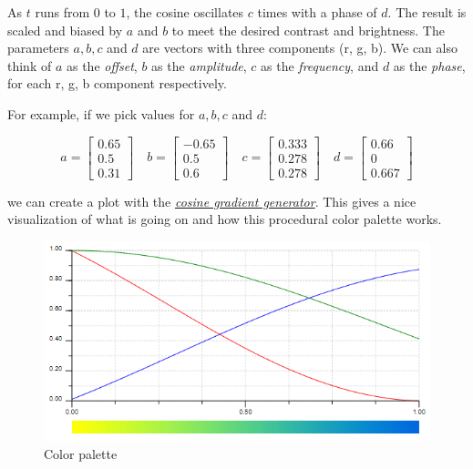 \documentclass[11pt]{article}
\makeatletter
\def\maxwidth{\ifdim\Gin@nat@width>\linewidth\linewidth
    \else\Gin@nat@width\fi}
\let\Oldincludegraphics\includegraphics
\renewcommand{\includegraphics}[1]{\Oldincludegraphics[width=.8\maxwidth]{#1}}
\makeatother
\begin{document}
    As \(t\) runs from \(0\) to \(1\), the cosine oscillates \(c\) times
with a phase of \(d\). The result is scaled and biased by \(a\) and
\(b\) to meet the desired contrast and brightness. The parameters
\(a, b, c\) and \(d\) are vectors with three components (r, g, b). We
can also think of \(a\) as the \emph{offset}, \(b\) as the
\emph{amplitude}, \(c\) as the \emph{frequency}, and \(d\) as the
\emph{phase}, for each r, g, b component respectively.

    For example, if we pick values for \(a, b, c\) and \(d\):

    \[ a = \begin{bmatrix} 0.65 \\ 0.5 \\ 0.31 \end{bmatrix} \quad b = \begin{bmatrix} -0.65 \\ 0.5 \\ 0.6 \end{bmatrix} \quad c = \begin{bmatrix} 0.333 \\ 0.278 \\ 0.278 \end{bmatrix} \quad d = \begin{bmatrix} 0.66 \\ 0 \\ 0.667 \end{bmatrix} \]

    we can create a plot with the
\href{http://dev.thi.ng/gradients/}{\emph{cosine gradient generator}}.
This gives a nice visualization of what is going on and how this
procedural color palette works.

    \begin{figure}[h]
\centering
\includegraphics{img/color-palette.png}
\caption{Color palette}
\end{figure}
\end{document}
